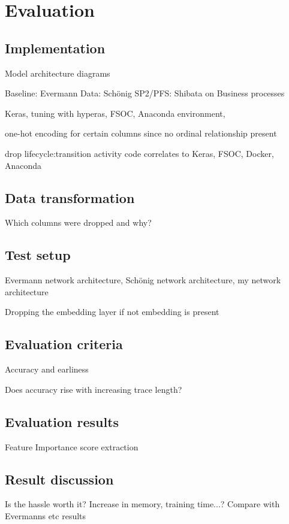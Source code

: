 \chapter{Evaluation}\label{sec:evaluation}


\section{Implementation}
Model architecture diagrams

Baseline: Evermann
Data: Schönig
SP2/PFS: Shibata on Business processes

Keras, tuning with hyperas, FSOC, Anaconda environment,

one-hot encoding for certain columns since no ordinal relationship present

drop lifecycle:transition
activity code correlates to 
Keras, FSOC, Docker, Anaconda

\section{Data transformation}
Which columns were dropped and why?

\section{Test setup}
Evermann network architecture, Schönig network architecture, my network architecture

Dropping the embedding layer if not embedding is present

\section{Evaluation criteria}
Accuracy and earliness

Does accuracy rise with increasing trace length?

\section{Evaluation results}
Feature Importance score extraction

\section{Result discussion}
Is the hassle worth it?
Increase in memory, training time...?
Compare with Evermanns etc results